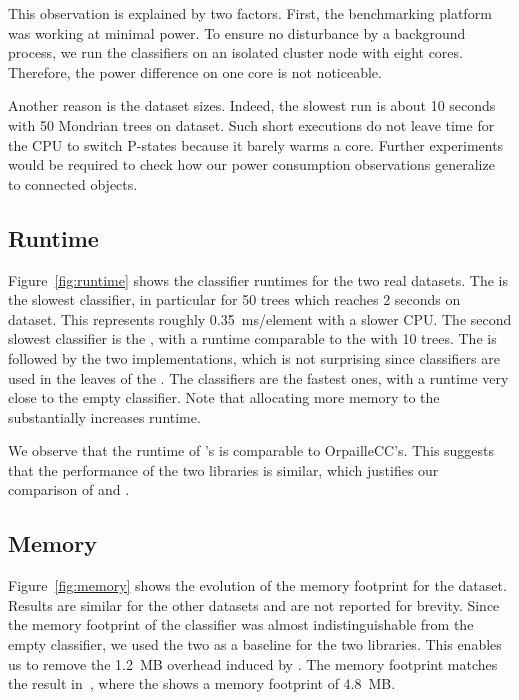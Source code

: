 This observation is explained by two factors. First, the benchmarking
platform was  working at minimal power. To ensure no disturbance by a
background process, we run the classifiers on an isolated cluster node with
eight cores. Therefore, the power difference on one core is not noticeable.

Another reason is the dataset sizes. Indeed, the slowest run is about
10 seconds with 50 Mondrian trees on \recofitdataset dataset. Such short
executions do not leave time for the CPU to switch P-states because it
barely warms a core. Further experiments would be required to check how 
our power consumption observations generalize to 
connected objects. 

\subsection{Runtime}

Figure~\ref{fig:runtime} shows the classifier runtimes for the two real
datasets. The \mondrianforest is the slowest classifier, in particular for 50
trees which reaches 2 seconds on \banosdataset dataset. This represents roughly
0.35~ms/element with a slower CPU. The second slowest classifier is the
\hoeffdingtree, with a runtime comparable to the \mondrianforest with 10 trees.
The \hoeffdingtree is followed by the two \naivebayes implementations, which is
not surprising since \naivebayes classifiers are used in the leaves of the
\hoeffdingtree. The \mcnn classifiers are the fastest ones, with a runtime very
close to the empty classifier. Note that allocating more memory to the
\mondrianforest substantially increases runtime.
 

We observe that the runtime of \streamdmcpp's \naivebayes is comparable to
OrpailleCC's. This suggests that the performance of the two libraries is
similar, which justifies our comparison of \hoeffdingtree and \mondrianforest.

\subsection{Memory}
\label{sec:result-memory}
Figure~\ref{fig:memory} shows the evolution of the memory footprint for the
\banosdataset dataset. Results are similar for the other datasets and are
not reported for brevity. Since the  memory footprint of the \naivebayes
classifier was almost indistinguishable from the empty classifier, we used
the two \naivebayes as a baseline for the two libraries. This enables us to
remove the 1.2~MB overhead induced by \streamdmcpp. The \streamdmcpp memory
footprint matches the result in~\cite{StreamDM-CPP}, where the
\hoeffdingtree shows a memory footprint of 4.8~MB.

